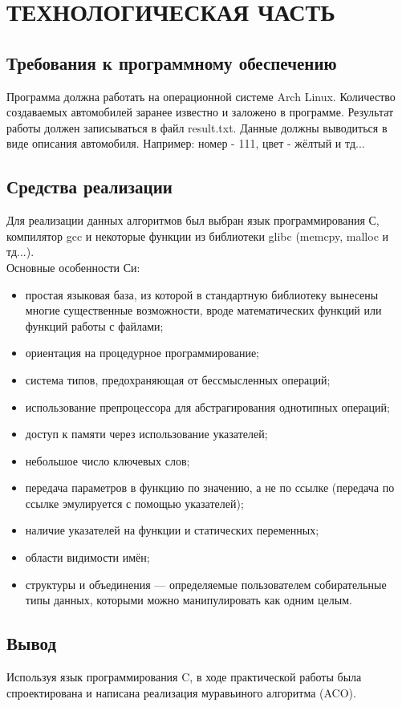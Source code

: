 \documentclass[a4paper,12pt]{article}
\begin{document}
\newpage
\section{ТЕХНОЛОГИЧЕСКАЯ ЧАСТЬ}
\subsection{Требования к программному обеспечению}
Программа должна работать на операционной системе Arch Linux. Количество создаваемых автомобилей заранее известно и заложено в программе. Результат работы должен записываться в файл result.txt. Данные должны выводиться в виде описания автомобиля. Например: номер - 111, цвет - жёлтый и тд...

\newpage
\subsection{Средства реализации}
Для реализации данных алгоритмов был выбран язык программирования С, компилятор gcc и некоторые функции из библиотеки glibc (memcpy, malloc и тд...). \\
Основные особенности Си:
\begin{itemize}
\item простая языковая база, из которой в стандартную библиотеку вынесены многие существенные возможности, вроде математических функций или функций работы с файлами;
\item ориентация на процедурное программирование;
\item система типов, предохраняющая от бессмысленных операций;
\item использование препроцессора для абстрагирования однотипных операций;
\item доступ к памяти через использование указателей;
\item небольшое число ключевых слов;
\item передача параметров в функцию по значению, а не по ссылке (передача по ссылке эмулируется с помощью указателей);
\item наличие указателей на функции и статических переменных;
\item области видимости имён;
\item структуры и объединения — определяемые пользователем собирательные типы данных, которыми можно манипулировать как одним целым.
\end{itemize}

\newpage
\subsection{Вывод}
Используя язык программирования C, в ходе практической работы была спроектирована и написана реализация муравьиного алгоритма (ACO).
\end{document}
